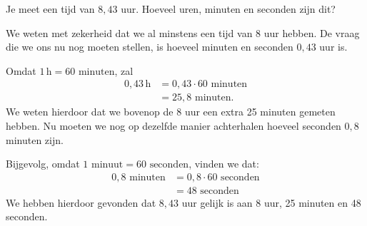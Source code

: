 \documentclass{ximera}
\begin{document}
\begin{example}[foldable=true,title={Voorbeeld: uur naar uur, minuten en seconden omzetten}]\nl
    Je meet een tijd van $8{,}43$ uur. Hoeveel uren, minuten en seconden zijn dit?

    \begin{solution}\nl
        We weten met zekerheid dat we al minstens een tijd van 8 uur hebben. De vraag die we ons nu nog moeten stellen, is hoeveel minuten en seconden $0{,}43$ uur is.

        Omdat $1 \, \mathrm{h} = 60 \text{ minuten}$, zal 
        \begin{align*}
        0{,}43 \, \mathrm{h} & = 0{,}43 \cdot 60 \text{ minuten} \\
        & = 25{,}8 \text{ minuten}.
        \end{align*}
        We weten hierdoor dat we bovenop de 8 uur een extra 25 minuten gemeten hebben. Nu moeten we nog op dezelfde manier achterhalen hoeveel seconden $0{,}8$ minuten zijn.

        Bijgevolg, omdat $1 \text{ minuut} = 60 \text{ seconden}$, vinden we dat:
        \begin{align*}
        0{,}8 \text{ minuten} & = 0{,}8 \cdot 60 \text{ seconden} \\
        & = 48 \text{ seconden}
        \end{align*}
        We hebben hierdoor gevonden dat $8{,}43$ uur gelijk is aan 8 uur, 25 minuten en 48 seconden.
    \end{solution}
\end{example}
\end{document}
